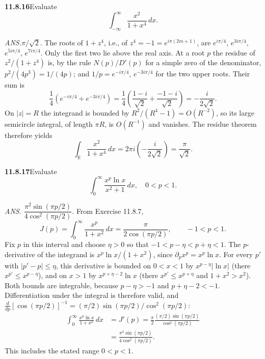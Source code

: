 \par\bigskip
\noindent\textbf{11.8.16}\quad Evaluate
\[
\int_{-\infty}^{\infty}\frac{x^{2}}{1+x^{4}}\,dx.
\]
\par\nobreak\hfill\emph{ANS.}\enspace $\pi/\sqrt{2}$.
\solution
The roots of $1+z^4$, i.e., of $z^4=-1=e^{i\pi(2m+1)}$, are
$e^{i\pi/4}$, $e^{3i\pi/4}$, $e^{5i\pi/4}$, $e^{7i\pi/4}$. Only the
first two lie above the real axis. At a root $p$ the residue of
$z^2/(1+z^4)$ is, by the rule $N(p)/D'(p)$ for a simple zero of the
denominator, $p^2/(4p^3)=1/(4p)$; and $1/p=e^{-i\pi/4}$,
$e^{-3i\pi/4}$ for the two upper roots. Their sum is
\[
\frac14\left(e^{-i\pi/4}+e^{-3i\pi/4}\right)
=\frac14\left(\frac{1-i}{\sqrt2}+\frac{-1-i}{\sqrt2}\right)
=-\frac{i}{2\sqrt2}.
\]
On $|z|=R$ the integrand is bounded by $R^2/(R^4-1)=O(R^{-2})$, so its
large semicircle integral, of length $\pi R$, is $O(R^{-1})$ and vanishes.
The residue theorem therefore yields
\[
\boxed{\int_{\mathbb R}\frac{x^2}{1+x^4}\,dx
=2\pi i\left(-\frac{i}{2\sqrt2}\right)=\frac{\pi}{\sqrt2}}.
\]

\par\bigskip
\noindent\textbf{11.8.17}\quad Evaluate
\[
\int_{0}^{\infty}\frac{x^{p}\ln x}{x^{2}+1}\,dx,\quad 0 < p < 1.
\]
\par\nobreak\hfill\emph{ANS.}\enspace
$\dfrac{\pi^{2}\sin(\pi p/2)}{4\cos^{2}(\pi p/2)}$.
\solution
From Exercise 11.8.7,
\[
J(p)=\int_0^\infty\frac{x^p}{1+x^2}\,dx
=\frac{\pi}{2\cos(\pi p/2)},\qquad -1<p<1.
\]
Fix $p$ in this interval and choose $\eta>0$ so that
$-1<p-\eta<p+\eta<1$. The $p$-derivative of the integrand is
$x^p\ln x/(1+x^2)$, since $\partial_px^p=x^p\ln x$. For every $p'$ with
$|p'-p|\le\eta$, this derivative is bounded on $0<x<1$ by
$x^{p-\eta}|\ln x|$ (there $x^{p'}\le x^{p-\eta}$), and on $x>1$ by
$x^{p+\eta-2}\ln x$ (there $x^{p'}\le x^{p+\eta}$ and $1+x^2>x^2$).
Both bounds are integrable, because $p-\eta>-1$ and $p+\eta-2<-1$.
Differentiation under the integral is therefore valid, and
$\frac{d}{dp}[\cos(\pi p/2)]^{-1}=(\pi/2)\sin(\pi p/2)/\cos^2(\pi p/2)$:
\[
\begin{aligned}
\int_0^\infty\frac{x^p\ln x}{1+x^2}\,dx
&=J'(p)
=\frac{\pi}{2}
\frac{(\pi/2)\sin(\pi p/2)}{\cos^2(\pi p/2)}\\
&=\boxed{\frac{\pi^2\sin(\pi p/2)}
{4\cos^2(\pi p/2)}}.
\end{aligned}
\]
This includes the stated range $0<p<1$.


